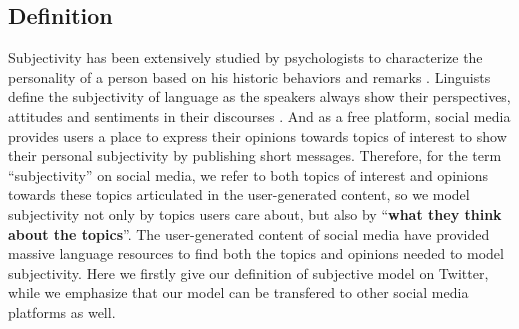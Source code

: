 \documentclass{acm_proc_article-sp}
\begin{document}
\subsection{Definition}
\label{definition}
Subjectivity has been extensively studied by psychologists to characterize the personality of a person based on his historic behaviors and remarks \cite{Engbert2007}. 
Linguists define the subjectivity of language as the speakers always show their perspectives, attitudes and sentiments in their discourses \cite{stein2005subjectivity}.
And as a free platform, social media provides users a place to express their opinions towards topics of interest to show their personal subjectivity by publishing short messages. 
Therefore, for the term ``subjectivity'' on social media, we refer to both topics of interest and opinions towards these topics articulated in the user-generated content, so we model subjectivity not only by topics users care about, but also by ``\textbf{what they think about the topics}''.
The user-generated content of social media have provided massive language resources to find both the topics and opinions needed to model subjectivity. 
Here we firstly give our definition of subjective model on Twitter, while we emphasize that our model can be transfered to other social media platforms as well.
\end{document}
